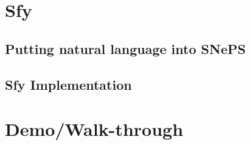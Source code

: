 \documentclass{beamer}
\begin{document}
\section{Sfy}

\subsection{Putting natural language into SNePS}


\subsection{Sfy Implementation}




\section{Demo/Walk-through}
\end{document}
